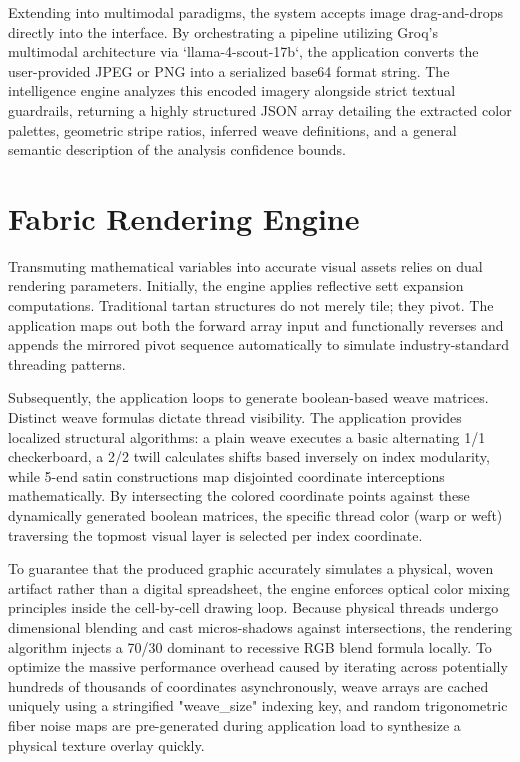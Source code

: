 Extending into multimodal paradigms, the system accepts image drag-and-drops directly into the interface. By orchestrating a pipeline utilizing Groq's multimodal architecture via `llama-4-scout-17b`, the application converts the user-provided JPEG or PNG into a serialized base64 format string. The intelligence engine analyzes this encoded imagery alongside strict textual guardrails, returning a highly structured JSON array detailing the extracted color palettes, geometric stripe ratios, inferred weave definitions, and a general semantic description of the analysis confidence bounds.

\section{Fabric Rendering Engine}
Transmuting mathematical variables into accurate visual assets relies on dual rendering parameters. Initially, the engine applies reflective sett expansion computations. Traditional tartan structures do not merely tile; they pivot. The application maps out both the forward array input and functionally reverses and appends the mirrored pivot sequence automatically to simulate industry-standard threading patterns. 

Subsequently, the application loops to generate boolean-based weave matrices. Distinct weave formulas dictate thread visibility. The application provides localized structural algorithms: a plain weave executes a basic alternating 1/1 checkerboard, a 2/2 twill calculates shifts based inversely on index modularity, while 5-end satin constructions map disjointed coordinate interceptions mathematically. By intersecting the colored coordinate points against these dynamically generated boolean matrices, the specific thread color (warp or weft) traversing the topmost visual layer is selected per index coordinate.

To guarantee that the produced graphic accurately simulates a physical, woven artifact rather than a digital spreadsheet, the engine enforces optical color mixing principles inside the cell-by-cell drawing loop. Because physical threads undergo dimensional blending and cast micros-shadows against intersections, the rendering algorithm injects a 70/30 dominant to recessive RGB blend formula locally. To optimize the massive performance overhead caused by iterating across potentially hundreds of thousands of coordinates asynchronously, weave arrays are cached uniquely using a stringified "{weave}_{size}" indexing key, and random trigonometric fiber noise maps are pre-generated during application load to synthesize a physical texture overlay quickly.

